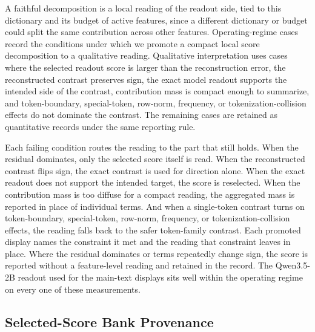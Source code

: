 A faithful decomposition is a local reading of the readout side, tied to
this dictionary and its budget of active features, since a different dictionary or
budget could split the same contribution across other features.
Operating-regime cases record the conditions under which we promote a
compact local score decomposition to a qualitative reading. Qualitative interpretation uses cases where the selected readout score is
larger than the reconstruction error, the reconstructed contrast preserves sign,
the exact model readout supports the intended side of the contrast, contribution mass is
compact enough to summarize, and token-boundary, special-token, row-norm,
frequency, or tokenization-collision effects do not dominate the contrast. The
remaining cases are retained as quantitative records under the same reporting
rule.

Each failing condition routes the reading to the part that still holds. When the residual dominates, only the selected score
itself is read. When the reconstructed contrast flips sign, the exact contrast
is used for direction alone. When the exact readout does not support the
intended target, the score is reselected. When the contribution mass is too
diffuse for a compact reading, the aggregated mass is reported in place of
individual terms. And when a single-token contrast turns on token-boundary,
special-token, row-norm, frequency, or tokenization-collision effects, the
reading falls back to the safer token-family contrast. Each promoted display
names the constraint it met and the reading that constraint leaves in
place. Where the residual dominates or terms repeatedly change sign, the
score is reported without a feature-level reading and retained in the
record. The Qwen3.5-2B readout used for the main-text displays sits well
within the operating regime on every one of these measurements.

\subsection{Selected-Score Bank Provenance}
\label{app:query-bank-provenance}

